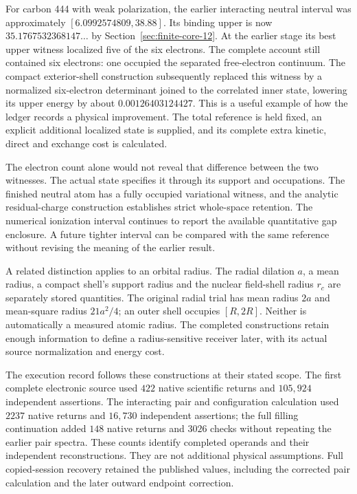 For carbon 444 with weak polarization, the earlier interacting neutral interval was approximately $[6.0992574809,38.88]$. Its binding upper is now $35.1767532368147\ldots$ by Section~\ref{sec:finite-core-12}. At the earlier stage its best upper witness localized five of the six electrons. The complete account still contained six electrons: one occupied the separated free-electron continuum. The compact exterior-shell construction subsequently replaced this witness by a normalized six-electron determinant joined to the correlated inner state, lowering its upper energy by about $0.00126403124427$. This is a useful example of how the ledger records a physical improvement. The total reference is held fixed, an explicit additional localized state is supplied, and its complete extra kinetic, direct and exchange cost is calculated. 

The electron count alone would not reveal that difference between the two witnesses. The actual state specifies it through its support and occupations. The finished neutral atom has a fully occupied variational witness, and the analytic residual-charge construction establishes strict whole-space retention. The numerical ionization interval continues to report the available quantitative gap enclosure. A future tighter interval can be compared with the same reference without revising the meaning of the earlier result.

A related distinction applies to an orbital radius. The radial dilation $a$, a mean radius, a compact shell's support radius and the nuclear field-shell radius $r_c$ are separately stored quantities. The original radial trial has mean radius $2a$ and mean-square radius $21a^2/4$; an outer shell occupies $[R,2R]$. Neither is automatically a measured atomic radius. The completed constructions retain enough information to define a radius-sensitive receiver later, with its actual source normalization and energy cost.

The execution record follows these constructions at their stated scope. The first complete electronic source used $422$ native scientific returns and $105{,}924$ independent assertions. The interacting pair and configuration calculation used $2237$ native returns and $16{,}730$ independent assertions; the full filling continuation added $148$ native returns and $3026$ checks without repeating the earlier pair spectra. These counts identify completed operands and their independent reconstructions. They are not additional physical assumptions. Full copied-session recovery retained the published values, including the corrected pair calculation and the later outward endpoint correction.

